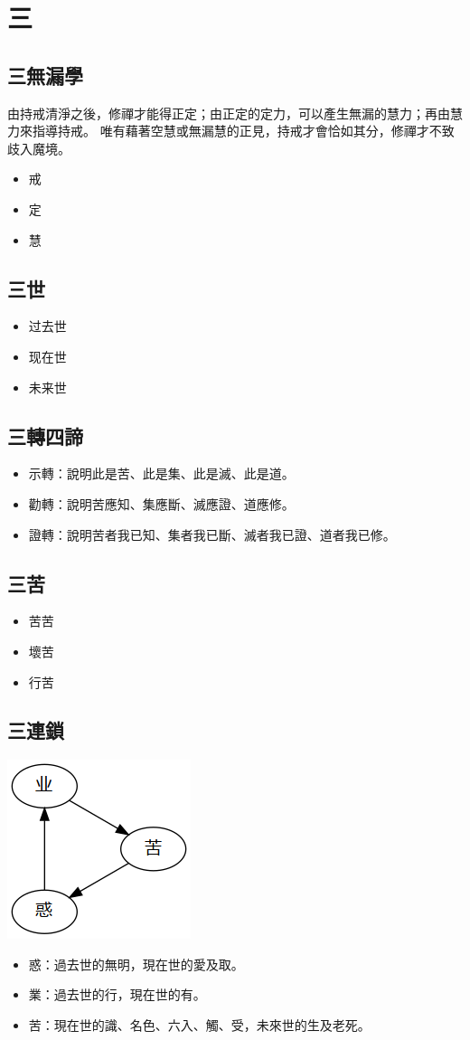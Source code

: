 \section{三}

\subsection{三無漏學}
由持戒清淨之後，修禪才能得正定；由正定的定力，可以產生無漏的慧力；再由慧力來指導持戒。
唯有藉著空慧或無漏慧的正見，持戒才會恰如其分，修禪才不致歧入魔境。
\begin{itemize}
  \item 戒
  \item 定
  \item 慧
\end{itemize}


\subsection{三世}
\begin{itemize}
  \item 过去世
  \item 现在世
  \item 未来世
\end{itemize}

\subsection{三轉四諦}
\begin{itemize}
  \item 示轉：說明此是苦、此是集、此是滅、此是道。
  \item 勸轉：說明苦應知、集應斷、滅應證、道應修。
  \item 證轉：說明苦者我已知、集者我已斷、滅者我已證、道者我已修。
\end{itemize}

\subsection{三苦}
\begin{itemize}
  \item 苦苦
  \item 壞苦
  \item 行苦
\end{itemize}

\subsection{三連鎖}
\includegraphics[scale=0.5]{释家/images/三连锁.png}
\begin{itemize}
  \item 惑：過去世的無明，現在世的愛及取。
  \item 業：過去世的行，現在世的有。
  \item 苦：現在世的識、名色、六入、觸、受，未來世的生及老死。
\end{itemize}
